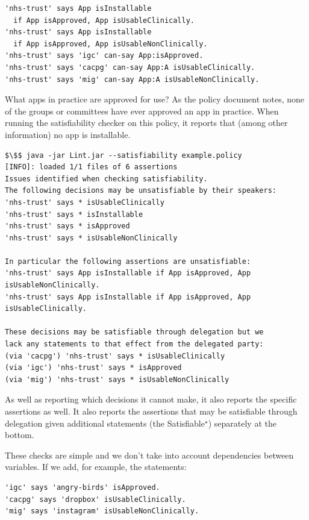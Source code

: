\documentclass[thesis.tex]{subfiles}
\begin{document}
\begin{lstlisting}
'nhs-trust' says App isInstallable
  if App isApproved, App isUsableClinically.
'nhs-trust' says App isInstallable
  if App isApproved, App isUsableNonClinically.
'nhs-trust' says 'igc' can-say App:isApproved.
'nhs-trust' says 'cacpg' can-say App:A isUsableClinically.
'nhs-trust' says 'mig' can-say App:A isUsableNonClinically.
\end{lstlisting}

What apps in practice are approved for use?
As the policy document notes, none of the groups or committees have ever
approved an app in practice.
When running the satisfiability checker on this policy,
it reports that (among other information) no app is installable.

\noindent\begin{minipage}{\textwidth}
\begin{lstlisting}
$\$$ java -jar Lint.jar --satisfiability example.policy
[INFO]: loaded 1/1 files of 6 assertions
Issues identified when checking satisfiability.
The following decisions may be unsatisfiable by their speakers:
'nhs-trust' says * isUsableClinically
'nhs-trust' says * isInstallable
'nhs-trust' says * isApproved
'nhs-trust' says * isUsableNonClinically

In particular the following assertions are unsatisfiable:
'nhs-trust' says App isInstallable if App isApproved, App isUsableNonClinically.
'nhs-trust' says App isInstallable if App isApproved, App isUsableClinically.

These decisions may be satisfiable through delegation but we
lack any statements to that effect from the delegated party:
(via 'cacpg') 'nhs-trust' says * isUsableClinically
(via 'igc') 'nhs-trust' says * isApproved
(via 'mig') 'nhs-trust' says * isUsableNonClinically
\end{lstlisting}
\end{minipage}

As well as reporting which decisions it cannot make, it also reports the
specific assertions as well. It also reports the assertions that may be
satisfiable through delegation given additional statements (the
Satisfiable$^\star$) separately at the bottom.

These checks are simple and we don't take into
account dependencies between variables. If we add, for example, the statements:

\begin{lstlisting}
'igc' says 'angry-birds' isApproved.
'cacpg' says 'dropbox' isUsableClinically.
'mig' says 'instagram' isUsableNonClinically.
\end{lstlisting}
\end{document}
